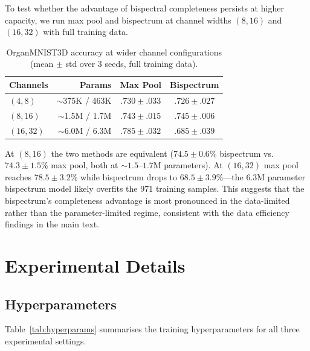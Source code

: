 \documentclass{article}
\theoremstyle{definition}
\theoremstyle{remark}
\theoremstyle{definition}
\begin{document}
To test whether the advantage of bispectral completeness persists at
higher capacity, we run max pool and bispectrum at channel widths
$(8, 16)$ and $(16, 32)$ with full training data.

\begin{table}[h]
  \caption{OrganMNIST3D accuracy at wider channel configurations
    (mean $\pm$ std over 3 seeds, full training data).}
  \label{tab:organ3d-wider}
  \centering
  \small
  \begin{tabular}{lrcc}
    \toprule
    Channels & Params & Max Pool & Bispectrum \\
    \midrule
    $(4, 8)$   & ${\sim}$375K / 463K  & $.730 \pm .033$ & $.726 \pm .027$ \\
    $(8, 16)$  & ${\sim}$1.5M / 1.7M  & $.743 \pm .015$ & $.745 \pm .006$ \\
    $(16, 32)$ & ${\sim}$6.0M / 6.3M  & $\mathbf{.785 \pm .032}$ & $.685 \pm .039$ \\
    \bottomrule
  \end{tabular}
\end{table}

At $(8, 16)$ the two methods are equivalent ($74.5 \pm 0.6\%$ bispectrum vs.\
$74.3 \pm 1.5\%$ max pool, both at ${\sim}1.5$--$1.7$M parameters). At $(16, 32)$ max
pool reaches $78.5 \pm 3.2\%$ while bispectrum drops to $68.5 \pm 3.9\%$---the 6.3M
parameter bispectrum model likely overfits the 971 training samples.
This suggests that the bispectrum's completeness advantage is most
pronounced in the data-limited rather than the parameter-limited
regime, consistent with the data efficiency findings in the main text.

\section{Experimental Details}
\label{app:exp}

\subsection{Hyperparameters}

Table~\ref{tab:hyperparams} summarises the training hyperparameters
for all three experimental settings.
\end{document}
